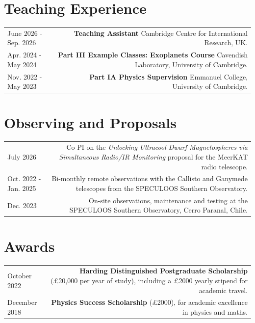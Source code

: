 \documentclass{article}
\begin{document}
\section*{Teaching Experience}

\begin{tabular}{L!{\vrule}R}
	June 2026 - Sep. 2026 & \textbf{Teaching Assistant} Cambridge Centre for International Research, UK. \\

	Apr. 2024 - May 2024 & \textbf{Part III Example Classes: Exoplanets Course} Cavendish Laboratory, University of Cambridge. \\

  Nov. 2022 - May 2023 & \textbf{Part IA Physics Supervision} Emmanuel College, University of Cambridge.\\

\end{tabular}

\section*{Observing and Proposals}

\begin{tabular}{L!{\vrule}R}
  July 2026 & Co-PI on the \textit{Unlocking Ultracool Dwarf Magnetospheres via Simultaneous Radio/IR Monitoring} proposal for the MeerKAT radio telescope. \\

	Oct. 2022 - Jan. 2025 & Bi-monthly remote observations with the Callisto and Ganymede telescopes from the SPECULOOS Southern Observatory. \\

  Dec. 2023 & On-site observations, maintenance and testing at the SPECULOOS Southern Observatory, Cerro Paranal, Chile. \\

\end{tabular}

\section*{Awards}

\begin{tabular}{L!{\vrule}R}

    October 2022 & \textbf{Harding Distinguished Postgraduate Scholarship} (£20,000 per year of study), including a £2000 yearly stipend for academic travel. \\
    December 2018 & \textbf{Physics Success Scholarship} (£2000), for academic excellence in physics and maths.\\

\end{tabular}
\end{document}
